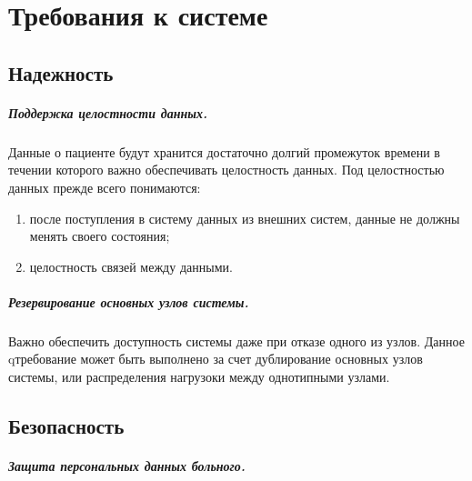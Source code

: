 \section{Требования к системе}

\subsection{Надежность}
\subparagraph{Поддержка целостности данных.}
Данные о пациенте будут хранится достаточно долгий промежуток времени в течении которого важно обеспечивать целостность данных. Под целостностью данных прежде всего понимаются:

\begin{enumerate}
  \item после поступления в систему данных из внешних систем, данные не должны
  менять своего состояния;
  \item целостность связей между данными. 
\end{enumerate}

\subparagraph{Резервирование основных узлов системы.}
Важно обеспечить доступность системы даже при отказе одного из узлов. Данное
qтребование может быть выполнено за счет дублирование основных узлов системы,
или распределения нагрузоки между однотипными узлами.

\subsection{Безопасность}
\subparagraph{Защита персональных данных больного.}

